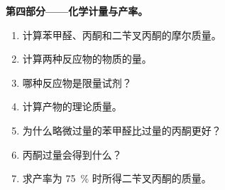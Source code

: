 \begin{problem}
\medskip
\noindent\textbf{第四部分——化学计量与产率。}
\begin{enumerate}[resume]
  \item 计算苯甲醛、丙酮和二苄叉丙酮的摩尔质量。
  \item 计算两种反应物的物质的量。
  \item 哪种反应物是限量试剂？
  \item 计算产物的理论质量。
  \item 为什么略微过量的苯甲醛比过量的丙酮更好？
  \item 丙酮过量会得到什么？
  \item 求产率为 75~\% 时所得二苄叉丙酮的质量。
\end{enumerate}
\end{problem}
